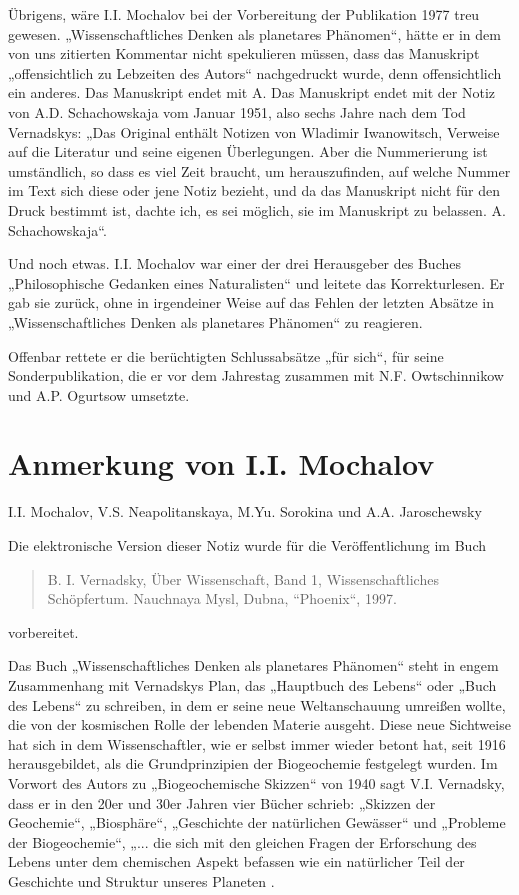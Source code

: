 \documentclass[11pt,a4paper]{article}
\begin{document}
Übrigens, wäre I.I. Mochalov bei der Vorbereitung der Publikation 1977 treu
gewesen. „Wissenschaftliches Denken als planetares Phänomen“, hätte er in dem
von uns zitierten Kommentar nicht spekulieren müssen, dass das Manuskript
„offensichtlich zu Lebzeiten des Autors“ nachgedruckt wurde, denn
offensichtlich ein anderes. Das Manuskript endet mit A. Das Manuskript endet
mit der Notiz von A.D. Schachowskaja vom Januar 1951, also sechs Jahre nach
dem Tod Vernadskys: „Das Original enthält Notizen von Wladimir Iwanowitsch,
Verweise auf die Literatur und seine eigenen Überlegungen. Aber die
Nummerierung ist umständlich, so dass es viel Zeit braucht, um herauszufinden,
auf welche Nummer im Text sich diese oder jene Notiz bezieht, und da das
Manuskript nicht für den Druck bestimmt ist, dachte ich, es sei möglich, sie
im Manuskript zu belassen. A. Schachowskaja“.

Und noch etwas. I.I. Mochalov war einer der drei Herausgeber des Buches
„Philosophische Gedanken eines Naturalisten“ und leitete das Korrekturlesen.
Er gab sie zurück, ohne in irgendeiner Weise auf das Fehlen der letzten
Absätze in „Wissenschaftliches Denken als planetares Phänomen“ zu
reagieren.

Offenbar rettete er die berüchtigten Schlussabsätze „für sich“, für seine
Sonderpublikation, die er vor dem Jahrestag zusammen mit N.F. Owtschinnikow
und A.P. Ogurtsow umsetzte.

\section{Anmerkung von I.I. Mochalov}
\begin{center}
  I.I. Mochalov, V.S. Neapolitanskaya, M.Yu. Sorokina und A.A. Jaroschewsky
\end{center}
Die elektronische Version dieser Notiz wurde für die Veröffentlichung im Buch
\begin{quote}
  B. I. Vernadsky, Über Wissenschaft, Band 1, Wissenschaftliches Schöpfertum.
  Nauchnaya Mysl, Dubna, “Phoenix“, 1997.
\end{quote}
vorbereitet.

Das Buch „Wissenschaftliches Denken als planetares Phänomen“ steht in engem
Zusammenhang mit Vernadskys Plan, das „Hauptbuch des Lebens“ oder „Buch des
Lebens“ zu schreiben, in dem er seine neue Weltanschauung umreißen wollte, die
von der kosmischen Rolle der lebenden Materie ausgeht. Diese neue Sichtweise
hat sich in dem Wissenschaftler, wie er selbst immer wieder betont hat, seit
1916 herausgebildet, als die Grundprinzipien der Biogeochemie festgelegt
wurden. Im Vorwort des Autors zu „Biogeochemische Skizzen“ von 1940 sagt
V.I. Vernadsky, dass er in den 20er und 30er Jahren vier Bücher schrieb:
„Skizzen der Geochemie“, „Biosphäre“, „Geschichte der natürlichen Gewässer“
und „Probleme der Biogeochemie“, „... die sich mit den gleichen Fragen der
Erforschung des Lebens unter dem chemischen Aspekt befassen wie ein
natürlicher Teil der Geschichte und Struktur unseres Planeten
\cite[S. 263]{Vernadsky1992}.
\end{document}
